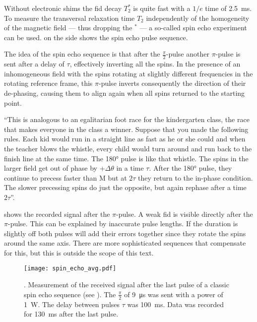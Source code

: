 Without electronic shims the \acrshort{fid} decay \(T_2^*\) is quite fast with a \(1/e\) time of \qty{2.5}{\milli\second}. To measure the transversal relaxation time \(T_2\) independently of the homogeneity of the magnetic field --- thus dropping the \(^*\) --- a so-called spin echo experiment can be used.  on the side shows the spin echo pulse sequence.

The idea of the spin echo sequence is that after the \(\frac{\pi}{2}\)-pulse another \(\pi\)-pulse is sent after a delay of \(\tau\), effectively inverting all the spins. In the presence of an inhomogeneous field with the spins rotating at slightly different frequencies in the rotating reference frame, this \(\pi\)-pulse inverts consequently the direction of their de-phasing, causing them to align again when all spins returned to the starting point.

\enquote{This is analogous to an egalitarian foot race for the kindergarten class, the race that makes everyone in the class a winner. Suppose that you made the following rules. Each kid would run in a straight line as fast as he or she could and when the teacher blows the whistle, every child would turn around and run back to the finish line at the same time. The \ang{180} pulse is like that whistle. The spins in the larger field get out of phase by \(+\Delta\theta\) in a time \(\tau\). After the \ang{180} pulse, they continue to precess faster than M but at \(2\tau\) they return to the in-phase condition. The slower precessing spins do just the opposite, but again rephase after a time \(2\tau\)}.

 shows the recorded signal after the \(\pi\)-pulse. A weak \acrshort{fid} is visible directly after the \(\pi\)-pulse. This can be explained by inaccurate pulse lengths. If the duration is slightly off both pulses will add their errors together since they rotate the spins around the same axis. There are more sophisticated sequences that compensate for this, but this is outside the scope of this text.

\begin{figure}[h!bt]
    \centering
    \texttt{[image: spin\_echo\_avg.pdf]}
    \caption{. Measurement of the received signal after the last pulse of a classic spin echo sequence (see ). The \(\frac{\pi}{2}\) of \qty{9}{\micro\second} was sent with a power of \qty{1}{\watt}. The delay between pulses \(\tau\) was \qty{100}{\milli\second}. Data was recorded for \qty{130}{\milli\second} after the last pulse.}
\end{figure}

